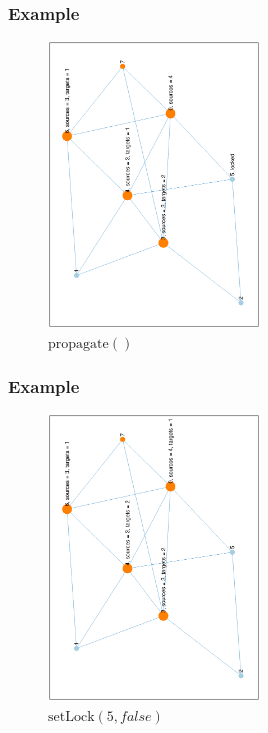 \documentclass{beamer}
\begin{document}
\begin{frame}
	\frametitle{Example}
	\begin{figure}
		\centering
		\includegraphics[width=0.5\textwidth,angle=-90]{../paper/graph/example/2.eps}
		\caption{$ \mathrm{propagate}() $}
	\end{figure}
\end{frame}

\begin{frame}
	\frametitle{Example}
	\begin{figure}
		\centering
		\includegraphics[width=0.5\textwidth,angle=-90]{../paper/graph/example/3.eps}
		\caption{$ \mathrm{setLock}(5, \mathit{false}) $}
	\end{figure}
\end{frame}
\end{document}
